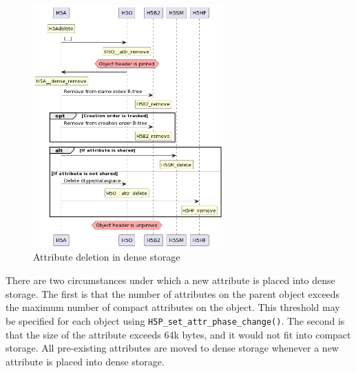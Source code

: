 \begin{figure}
    \centering
    \includegraphics[width=0.65\textwidth]{images/tour_3_uml_attr_remove_dense}
    \caption{Attribute deletion in dense storage}
    \label{fig:tour-3-uml-attr-remove-dense}
\end{figure}

There are two circumstances under which a new attribute is placed into dense storage. The first is that the number of attributes on the parent object exceeds the maximum number of compact attributes on the object. This threshold may be specified for each object using \texttt{H5P\_set\_attr\_phase\_change()}. The second is that the size of the attribute exceeds 64k bytes, and it would not fit into compact storage. All pre-existing attributes are moved to dense storage whenever a new attribute is placed into dense storage. 

